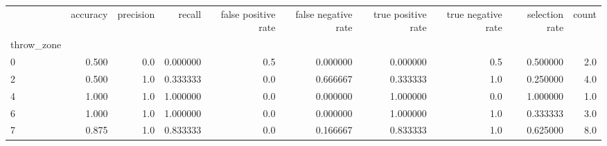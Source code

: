 \begin{tabular}{lrrrrrrrrr}
\toprule
{} &  accuracy &  precision &    recall &  false positive rate &  false negative rate &  true positive rate &  true negative rate &  selection rate &  count \\
throw\_zone &           &            &           &                      &                      &                     &                     &                 &        \\
\midrule
0          &     0.500 &        0.0 &  0.000000 &                  0.5 &             0.000000 &            0.000000 &                 0.5 &        0.500000 &    2.0 \\
2          &     0.500 &        1.0 &  0.333333 &                  0.0 &             0.666667 &            0.333333 &                 1.0 &        0.250000 &    4.0 \\
4          &     1.000 &        1.0 &  1.000000 &                  0.0 &             0.000000 &            1.000000 &                 0.0 &        1.000000 &    1.0 \\
6          &     1.000 &        1.0 &  1.000000 &                  0.0 &             0.000000 &            1.000000 &                 1.0 &        0.333333 &    3.0 \\
7          &     0.875 &        1.0 &  0.833333 &                  0.0 &             0.166667 &            0.833333 &                 1.0 &        0.625000 &    8.0 \\
\bottomrule
\end{tabular}

